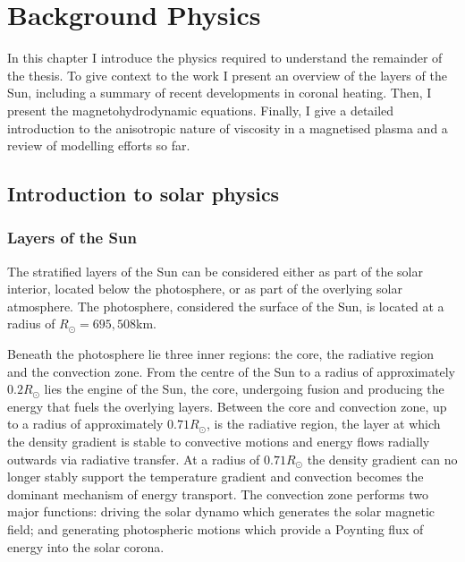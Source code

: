 \chapter{Background Physics}
\label{chp:background}

\graphicspath{{images/background/}}

In this chapter I introduce the physics required to understand the remainder of the thesis. To give context to the work I present an overview of the layers of the Sun, including a summary of recent developments in coronal heating. Then, I present the magnetohydrodynamic equations. Finally, I give a detailed introduction to the anisotropic nature of viscosity in a magnetised plasma and a review of modelling efforts so far.

\section{Introduction to solar physics}

\subsection{Layers of the Sun}

The stratified layers of the Sun can be considered either as part of the solar interior, located below the photosphere, or as part of the overlying solar atmosphere. The photosphere, considered the surface of the Sun, is located at a radius of $R_{\odot} = 695,508$km.

Beneath the photosphere lie three inner regions: the core, the radiative region and the convection zone. From the centre of the Sun to a radius of approximately $0.2 R_{\odot}$ lies the engine of the Sun, the core, undergoing fusion and producing the energy that fuels the overlying layers. Between the core and convection zone, up to a radius of approximately  $0.71R_{\odot}$, is the radiative region, the layer at which the density gradient is stable to convective motions and energy flows radially outwards via radiative transfer. At a radius of $0.71R_{\odot}$ the density gradient can no longer stably support the temperature gradient and convection becomes the dominant mechanism of energy transport. The convection zone performs two major functions: driving the solar dynamo which generates the solar magnetic field; and generating photospheric motions which provide a Poynting flux of energy into the solar corona.

